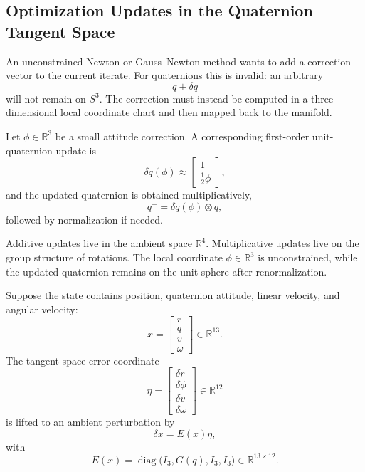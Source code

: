 \subsection{Optimization Updates in the Quaternion Tangent Space}
\label{sec:app-optimization-updates-in-the-quaternion-tangent-space}

\begin{remark}
	An unconstrained Newton or Gauss--Newton method wants to add a correction vector to the current iterate. For quaternions this is invalid: an arbitrary
	\[
		q+\delta q
	\]
	will not remain on $S^3$. The correction must instead be computed in a three-dimensional local coordinate chart and then mapped back to the manifold.
\end{remark}

\begin{definition}\label{def:app-small-angle-quaternion-update}
	Let $\phi \in \mathbb{R}^{3}$ be a small attitude correction. A corresponding first-order unit-quaternion update is
	\[
		\delta q(\phi)
		\approx
		\begin{bmatrix}
			1 \\
			\frac{1}{2}\phi
		\end{bmatrix},
	\]
	and the updated quaternion is obtained multiplicatively,
	\[
		q^{+} = \delta q(\phi)\otimes q,
	\]
	followed by normalization if needed.
\end{definition}

\begin{remark}
	Additive updates live in the ambient space $\mathbb{R}^{4}$. Multiplicative updates live on the group structure of rotations. The local coordinate $\phi \in \mathbb{R}^{3}$ is unconstrained, while the updated quaternion remains on the unit sphere after renormalization.
\end{remark}

\begin{definition}\label{def:app-full-state-projection-matrix-for-error-coordinates}
	Suppose the state contains position, quaternion attitude, linear velocity, and angular velocity:
	\[
		x=
		\begin{bmatrix}
			r \\
			q \\
			v \\
			\omega
		\end{bmatrix}
		\in \mathbb{R}^{13}.
	\]
	The tangent-space error coordinate
	\[
		\eta=
		\begin{bmatrix}
			\delta r \\
			\delta \phi \\
			\delta v \\
			\delta \omega
		\end{bmatrix}
		\in \mathbb{R}^{12}
	\]
	is lifted to an ambient perturbation by
	\[
		\delta x = E(x)\eta,
	\]
	with
	\[
		E(x)
		=
		\operatorname{diag}\!\bigl(I_3,G(q),I_3,I_3\bigr)
		\in \mathbb{R}^{13\times 12}.
	\]
\end{definition}

